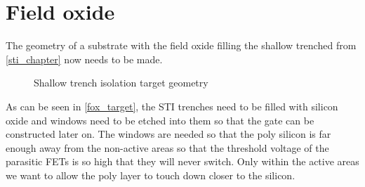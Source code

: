 \section{Field oxide}\label{fox_chapter}

The geometry of a substrate with the field oxide filling the shallow trenched from \autoref{sti_chapter} now needs to be made.

\begin{figure}[H]
	\centering
	\begin{tikzpicture}[node distance = 3cm, auto, thick,scale=\CrossAndTopSectionBig, every node/.style={transform shape}]
		
	\end{tikzpicture}
	\begin{tikzpicture}[node distance = 3cm, auto, thick,scale=\CrossAndTopSectionBig, every node/.style={transform shape}]
		
	\end{tikzpicture}
	\caption{Shallow trench isolation target geometry}
	\label{fox_target}
\end{figure}

As can be seen in \autoref{fox_target}, the STI trenches need to be filled with silicon oxide and windows need to be etched into them so that the gate can be constructed later on.
The windows are needed so that the poly silicon is far enough away from the non-active areas so that the threshold voltage of the parasitic FETs is so high that they will never switch.
Only within the active areas we want to allow the poly layer to touch down closer to the silicon.